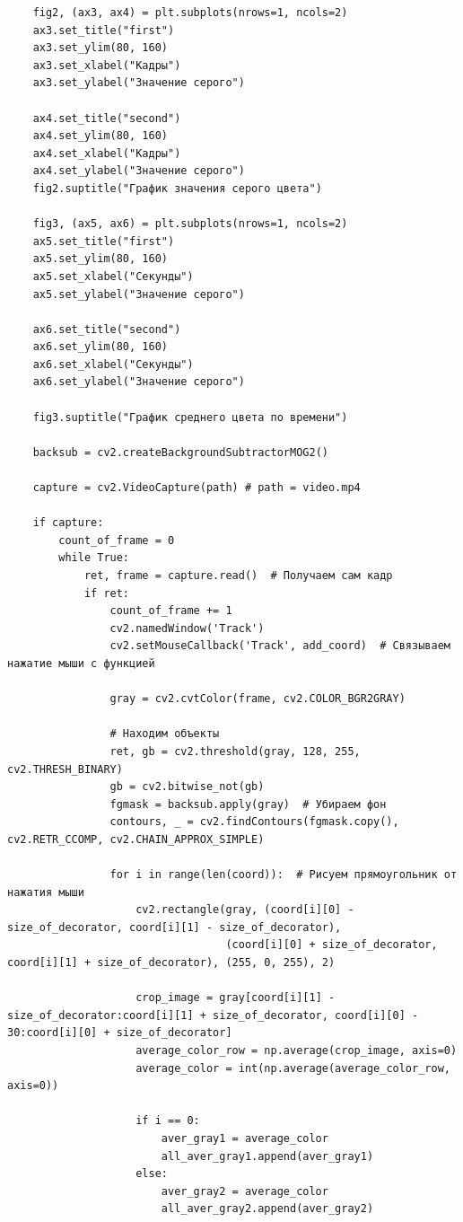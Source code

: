 \documentclass[a4paper,12pt]{article}
\begin{document}
\begin{verbatim}
    fig2, (ax3, ax4) = plt.subplots(nrows=1, ncols=2)
    ax3.set_title("first")
    ax3.set_ylim(80, 160)
    ax3.set_xlabel("Кадры")
    ax3.set_ylabel("Значение серого")

    ax4.set_title("second")
    ax4.set_ylim(80, 160)
    ax4.set_xlabel("Кадры")
    ax4.set_ylabel("Значение серого")
    fig2.suptitle("График значения серого цвета")

    fig3, (ax5, ax6) = plt.subplots(nrows=1, ncols=2)
    ax5.set_title("first")
    ax5.set_ylim(80, 160)
    ax5.set_xlabel("Секунды")
    ax5.set_ylabel("Значение серого")

    ax6.set_title("second")
    ax6.set_ylim(80, 160)
    ax6.set_xlabel("Секунды")
    ax6.set_ylabel("Значение серого")

    fig3.suptitle("График среднего цвета по времени")

    backsub = cv2.createBackgroundSubtractorMOG2()

    capture = cv2.VideoCapture(path) # path = video.mp4

    if capture:
        count_of_frame = 0
        while True:
            ret, frame = capture.read()  # Получаем сам кадр
            if ret:
                count_of_frame += 1
                cv2.namedWindow('Track')
                cv2.setMouseCallback('Track', add_coord)  # Связываем нажатие мыши с функцией

                gray = cv2.cvtColor(frame, cv2.COLOR_BGR2GRAY)

                # Находим объекты
                ret, gb = cv2.threshold(gray, 128, 255, cv2.THRESH_BINARY)
                gb = cv2.bitwise_not(gb)
                fgmask = backsub.apply(gray)  # Убираем фон
                contours, _ = cv2.findContours(fgmask.copy(), cv2.RETR_CCOMP, cv2.CHAIN_APPROX_SIMPLE)

                for i in range(len(coord)):  # Рисуем прямоугольник от нажатия мыши
                    cv2.rectangle(gray, (coord[i][0] - size_of_decorator, coord[i][1] - size_of_decorator),
                                  (coord[i][0] + size_of_decorator, coord[i][1] + size_of_decorator), (255, 0, 255), 2)

                    crop_image = gray[coord[i][1] - size_of_decorator:coord[i][1] + size_of_decorator, coord[i][0] - 30:coord[i][0] + size_of_decorator]
                    average_color_row = np.average(crop_image, axis=0)
                    average_color = int(np.average(average_color_row, axis=0))

                    if i == 0:
                        aver_gray1 = average_color
                        all_aver_gray1.append(aver_gray1)
                    else:
                        aver_gray2 = average_color
                        all_aver_gray2.append(aver_gray2)


\end{verbatim}
\end{document}
